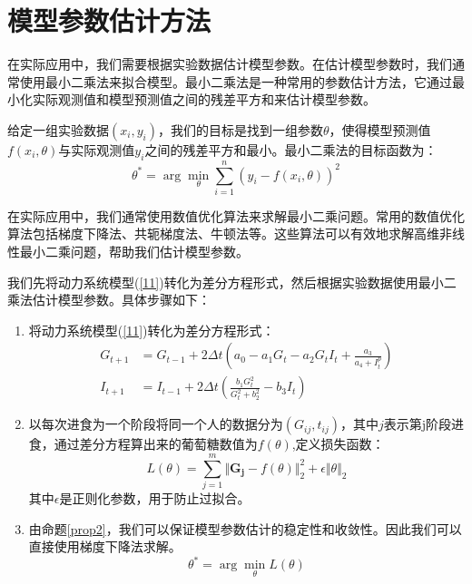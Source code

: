 \section{模型参数估计方法}
在实际应用中，我们需要根据实验数据估计模型参数。在估计模型参数时，我们通常使用最小二乘法来拟合模型。最小二乘法是一种常用的参数估计方法，它通过最小化实际观测值和模型预测值之间的残差平方和来估计模型参数。

\begin{defn}[最小二乘法]
    给定一组实验数据$(x_i, y_i)$，我们的目标是找到一组参数$\theta$，使得模型预测值$f(x_i, \theta)$与实际观测值$y_i$之间的残差平方和最小。最小二乘法的目标函数为：
    \begin{equation}
        \theta^* = \arg\min_{\theta} \sum_{i=1}^{n} (y_i - f(x_i, \theta))^2
    \end{equation}
\end{defn}

在实际应用中，我们通常使用数值优化算法来求解最小二乘问题。常用的数值优化算法包括梯度下降法、共轭梯度法、牛顿法等。这些算法可以有效地求解高维非线性最小二乘问题，帮助我们估计模型参数。

我们先将动力系统模型(\ref{11})转化为差分方程形式，然后根据实验数据使用最小二乘法估计模型参数。具体步骤如下：

\begin{enumerate}
    \item 将动力系统模型(\ref{11})转化为差分方程形式：
          \begin{equation}
              \begin{aligned}
                  G_{t+1} & = G_{t-1} + 2\Delta t \left(a_0-a_1G_t-a_2G_tI_t+\frac{a_3}{a_4+I_t^p}\right) \\
                  I_{t+1} & = I_{t-1} + 2\Delta t \left(\frac{b_1 G_t^2}{G_t^2 + b_2^2} - b_3 I_t\right)
              \end{aligned}
          \end{equation}
    \item 以每次进食为一个阶段将同一个人的数据分为$(G_{ij}, t_{ij})$，其中$j$表示第j阶段进食，通过差分方程算出来的葡萄糖数值为$f(\theta)$,定义损失函数：
          \begin{equation}
              L(\theta) = \sum_{j=1}^{m} \Vert \mathbf{G_j}-f(\theta) \Vert_2^2+\epsilon\Vert \theta \Vert_2
          \end{equation}
          其中$\epsilon$是正则化参数，用于防止过拟合。
    \item 由命题\ref{prop2}，我们可以保证模型参数估计的稳定性和收敛性。因此我们可以直接使用梯度下降法求解。
          \begin{equation}
              \theta^* = \arg\min_{\theta} L(\theta)
          \end{equation}
\end{enumerate}